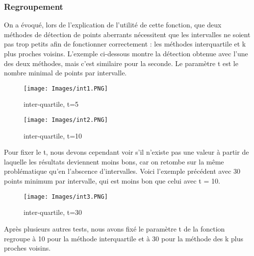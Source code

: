 \documentclass[a4paper,12pt]{article} %
\begin{document}
            
            \subsubsection{Regroupement}
            
            
                 On a évoqué, lors de l'explication de l'utilité de cette fonction, que deux méthodes de détection de points aberrants nécessitent que les intervalles ne soient pas trop petits afin de fonctionner correctement : les méthodes interquartile et k plus proches voisins. L'exemple ci-dessous montre la détection obtenue avec l'une des deux méthodes, mais c'est similaire pour la seconde. Le paramètre t est le nombre minimal de points par intervalle.
                 \begin{figure}[H] %
                \texttt{[image: Images/int1.PNG]} %
                \caption{inter-quartile, t=5} %
                \label{m15} %
                \endminipage
                \texttt{[image: Images/int2.PNG]}  
                \caption{inter-quartile, t=10}
                \label{m5}
                \endminipage
                \end{figure}
                Pour fixer le t, nous devons cependant voir s'il n'existe pas une valeur à partir de laquelle les résultats deviennent moins bons, car on retombe sur la même problématique qu'en l'abscence d'intervalles. Voici l'exemple précédent avec 30 points minimum par intervalle, qui est moins bon que celui avec t = 10.
                \begin{figure}[H]
                    \centering
                 \texttt{[image: Images/int3.PNG]} %
                \caption{inter-quartile, t=30} 
                \end{figure}
                
                Après plusieurs autres tests, nous avons fixé le paramètre t de la fonction regroupe à 10 pour la méthode interquartile et à 30 pour la méthode des k plus proches voisins.
        
\end{document}
